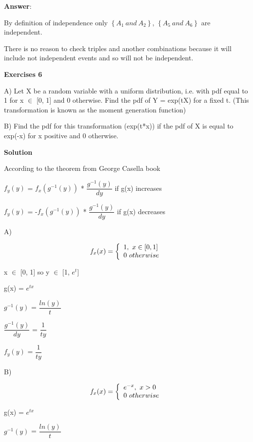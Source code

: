 \documentclass[12pt]{article}
\theoremstyle{definiton}
\theoremstyle{definition}
\theoremstyle{definition}
\begin{document}
		\medskip
		\textbf{Answer}:	
			
By definition of independence only 		
$\left\lbrace A_1\ and\ A_2 \right\rbrace$,
$\left\lbrace A_5\ and\ A_6 \right\rbrace$ are independent.

There is no reason to check triples and another combinations because it will include not independent events and so will not be independent.
		
		\bigskip
		
		\textbf{Exercises 6}

A)  Let X be a random variable with a uniform distribution, i.e. with pdf equal to 1 for
x $\in$ [0, 1] and 0 otherwise. Find the pdf of Y = exp(tX) for a fixed t. (This transformation is known as the moment generation function)

B) Find the pdf for this transformation (exp(t*x)) if the pdf of X is equal to exp(-x) for x positive and 0 otherwise.
		
		\medskip
		
		\textbf{Solution}
		
According to the theorem from George Casella book
\medskip

$f_y(y)$ = $f_x(g^{-1}(y))$ * $\dfrac{g^{-1}(y)}{dy}$ if g(x) increases
\medskip

$f_y(y)$ = -$f_x(g^{-1}(y))$ * $\dfrac{g^{-1}(y)}{dy}$ if g(x) decreases
\medskip

A) 
\medskip

\[f_x(x) = \left\{
\begin{array}{l l}
  1,\ x \in [0, 1]\\
  0\ otherwise
\end{array} \right.\]
\medskip

x $\in$ [0, 1] so 
y $\in$ [1, $e^t$]
\medskip

g(x) = $e^{tx}$	
\medskip

$g^{-1}(y)$ = $\dfrac{ln(y)}{t}$
\medskip

$\dfrac{g^{-1}(y)}{dy}$ = $\dfrac{1}{ty}$
\medskip

$f_y(y)$ = $\dfrac{1}{ty}$
\medskip

B)
\medskip

\[f_x(x) = \left\{
\begin{array}{l l}
  e^{-x},\ x > 0\\
  0\ otherwise
\end{array} \right.\]
\medskip

g(x) = $e^{tx}$	
\medskip

$g^{-1}(y)$ = $\dfrac{ln(y)}{t}$
\medskip
\end{document}
